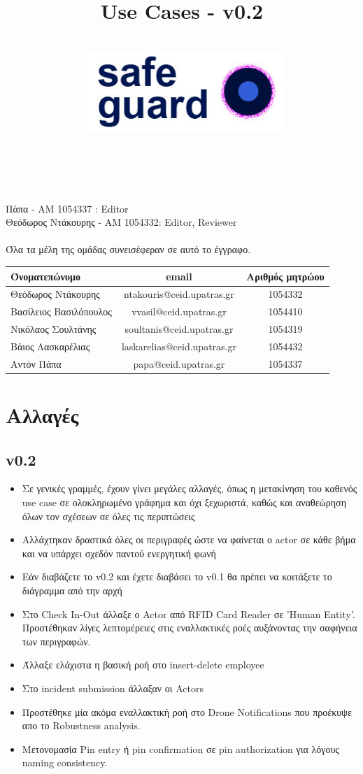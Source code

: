 \documentclass{article}
\title{Use Cases - v0.2}
\author{\\
\includegraphics[width=3in]{safeguard}\\[1ex]\\\\
}
\begin{document}
\maketitle

\newpage

 Πάπα - ΑΜ 1054337 : Editor \\
Θεόδωρος Ντάκουρης - AM 1054332: Editor, Reviewer\\\\
Όλα τα μέλη της ομάδας συνεισέφεραν σε αυτό το έγγραφο.
\\

\begin{tabular}{|l|c|c|}
\hline
Όνοματεπώνυμο & email & Αριθμός μητρώου  \\
\hline
Θεόδωρος Ντάκουρης & ntakouris@ceid.upatras.gr & 1054332 \\
Βασίλειος Βασιλόπουλος & vvasil@ceid.upatras.gr &  1054410 \\
Νικόλαος Σουλτάνης & soultanis@ceid.upatras.gr & 1054319  \\
Βάιος Λασκαρέλιας & laskarelias@ceid.upatras.gr & 1054432 \\
Αντόν Πάπα & papa@ceid.upatras.gr & 1054337 \\
\hline
\end{tabular}

\renewcommand{\contentsname}{Περιεχόμενα}
\tableofcontents

\newpage

\section{Αλλαγές}
\subsection{v0.2}
\begin{itemize}
    \item Σε γενικές γραμμές, έχουν γίνει μεγάλες αλλαγές, όπως η μετακίνηση του καθενός use case σε ολοκληρωμένο γράφημα και όχι ξεχωριστά, καθώς και αναθεώρηση όλων τον σχέσεων σε όλες τις περιπτώσεις
    \item Αλλάχτηκαν δραστικά όλες οι περιγραφές ώστε να φαίνεται ο actor σε κάθε βήμα και να υπάρχει σχεδόν παντού ενεργητική φωνή
    \item Εάν διαβάζετε το v0.2 και έχετε διαβάσει το v0.1 θα πρέπει να κοιτάξετε το διάγραμμα από την αρχή
    \item Στο Check In-Out άλλαξε ο Actor από RFID Card Reader σε 'Human Entity'. Προστέθηκαν λίγες λεπτομέρειες στις εναλλακτικές ροές αυξάνοντας την σαφήνεια των περιγραφών.
    \item Άλλαξε ελάχιστα η βασική ροή στο insert-delete employee
    \item Στο incident submission άλλαξαν οι Actors 
    \item Προστέθηκε μία ακόμα εναλλακτική ροή στο Drone Notifications που προέκυψε απο το Robustness analysis.
    \hline %
    \item Μετονομασία Pin entry ή pin confirmation σε pin authorization για λόγους naming consistency.
\end{itemize}
\end{document}
